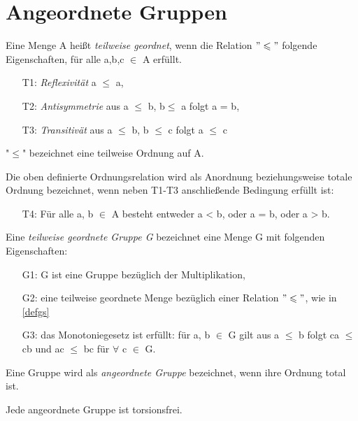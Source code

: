 \section{Angeordnete Gruppen}
%
\begin{defn}\label{defgs} 
Eine Menge A heißt \textit{teilweise geordnet}, wenn die Relation $ "\leqslant" $ folgende Eigenschaften, für alle a,b,c $ \in $ A  erfüllt.
%
\begin{enumerate}
\item[T1:] \textit{Reflexivität} a $\leqslant $ a,
\item[T2:] \textit{Antisymmetrie} aus a $\leqslant $ b, b$ \leqslant $ a folgt a = b,
\item[T3:] \textit{Transitivät} aus a $ \leqslant $ b, b $\leqslant $ c folgt a $ \leqslant $ c
\end{enumerate}
%
"$ \leqslant $" bezeichnet eine teilweise Ordnung auf A.
\end{defn}
Die oben definierte Ordnungsrelation wird als Anordnung beziehungsweise totale Ordnung bezeichnet, wenn neben T1-T3 anschließende Bedingung erfüllt ist:
%
\begin{enumerate}
\item[T4:] Für alle a, b $ \in $ A besteht entweder a < b, oder a = b, oder a > b. \cite{fuchs66}
\end{enumerate}
%
%
\begin{defn}\label{twgG}
Eine \textit{teilweise geordnete Gruppe G} bezeichnet eine Menge G mit folgenden Eigenschaften: 
%
\begin{enumerate}
\item[G1:] G ist eine Gruppe bezüglich der Multiplikation,
\item[G2:] eine teilweise geordnete Menge bezüglich einer Relation $" \leqslant "$, wie in \ref{defgs} 
\item[G3:] das Monotoniegesetz ist erfüllt: für a, b $\in $ G gilt aus a $ \leqslant $ b folgt ca $ \leqslant $ cb und ac $\leqslant $ bc für $\forall$ c $\in$ G. \cite{fuchs66}
\end{enumerate}
% 
\end{defn}
%
%
\begin{defn}\label{agG}
Eine Gruppe wird als \textit{angeordnete Gruppe} bezeichnet, wenn ihre Ordnung total ist.
\end{defn}
%
\begin{satz} \label{satzaGtf} 
Jede angeordnete Gruppe ist torsionsfrei. \cite{priesscrampe83}
\end{satz}

